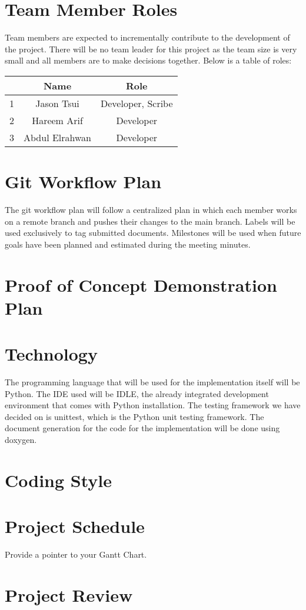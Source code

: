 \documentclass[12pt]{article}
\begin{document}
\section{Team Member Roles}

\tab Team members are expected to incrementally contribute to the development of the project. There will be no team leader for this project as the team size is very small and all members are to make decisions together. Below is a table of roles:

\begin{center}
  \begin{tabular}{|c|c|c|}
  \hline
  &Name & Role \\ \hline
  1& Jason Tsui & Developer, Scribe\\ 
  2& Hareem Arif & Developer\\ 
  3&Abdul Elrahwan & Developer\\ \hline
\end{tabular}
\end{center}

\section{Git Workflow Plan}

\tab The git workflow plan will follow a centralized plan in which each member works on a remote branch and pushes their changes to the main branch. Labels will be used exclusively to tag submitted documents. Milestones will be used when future goals have been planned and estimated during the meeting minutes. 

\section{Proof of Concept Demonstration Plan}

\section{Technology}

\tab The programming language that will be used for the implementation itself will be Python. The IDE used will be IDLE, the already integrated development environment that comes with Python installation. The testing framework we have decided on is unittest, which is the Python unit testing framework. The document generation for the code for the implementation will be done using doxygen. 

\section{Coding Style}

\section{Project Schedule}

Provide a pointer to your Gantt Chart.

\section{Project Review}
\end{document}
